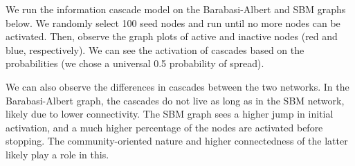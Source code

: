 \documentclass[11pt]{article}
\begin{document}
    We run the information cascade model on the Barabasi-Albert and SBM
graphs below. We randomly select 100 seed nodes and run until no more
nodes can be activated. Then, observe the graph plots of active and
inactive nodes (red and blue, respectively). We can see the activation
of cascades based on the probabilities (we chose a universal 0.5
probability of spread).

We can also observe the differences in cascades between the two
networks. In the Barabasi-Albert graph, the cascades do not live as long
as in the SBM network, likely due to lower connectivity. The SBM graph
sees a higher jump in initial activation, and a much higher percentage
of the nodes are activated before stopping. The community-oriented
nature and higher connectedness of the latter likely play a role in
this.
\end{document}
